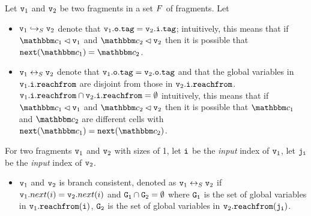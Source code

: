 Let $\mathtt{v}_1$ and $\mathtt{v}_2$ be two fragments in a set $F$ of fragments.
Let
\begin{itemize}
\item  $\mathtt{v}_1 \hookrightarrow_S \mathtt{v}_2$ denote that $\mathtt{v}_1.\mathtt{o}.\mathtt{tag} = \mathtt{v}_2.\mathtt{i}.\mathtt{tag}$;
   
  intuitively, this means that if
  $\cell_1 \lhd \frag_1$ and  $\cell_2 \lhd \frag_2$ then it is possible that
  $\mathtt{next}(\cell_1) = \cell_2$.
\item  $\mathtt{v}_1 \leftrightarrow_S \mathtt{v}_2$ denote that $\mathtt{v}_1.\mathtt{o}.\mathtt{tag} = \mathtt{v}_2.\mathtt{o}.\mathtt{tag}$ and that 
  the global variables in  $\mathtt{v}_1.\mathtt{i}.\mathtt{reachfrom}$ are disjoint from
  those in $\mathtt{v}_2.\mathtt{i}.\mathtt{reachfrom}$.
  $\mathtt{v}_1.\mathtt{i}.\mathtt{reachfrom} \cap \mathtt{v}_2.\mathtt{i}.\mathtt{reachfrom} = \emptyset$ 
    
  intuitively, this means that if
  $\cell_1 \lhd \frag_1$ and  $\cell_2 \lhd \frag_2$ then it is possible that
  $\cell_1$ and $\cell_2$ are different cells with
  $\mathtt{next}(\cell_1) = \mathtt{next}(\cell_2)$.
\end{itemize}
For two fragments $\mathtt{v}_1$ and $\mathtt{v}_2$ with sizes of 1, let $\tt i$ be the {\em input} index of $\mathtt{v}_1$, let $\tt j_i$ be the {\em input} index of $\mathtt{v}_2$.
 \begin{itemize}
 \item $\mathtt{v}_1$ and $\mathtt{v}_2$ is branch consistent, denoted as $\mathtt{v}_1 \leftrightarrow_S \mathtt{v}_2$ if $\mathtt{v}_1.next(i) = \mathtt{v}_2.next(i)$ and $\tt G_1 \cap G_2 = \emptyset$ where $\tt G_1$ is the set of global variables in $\mathtt{v}_1.{\tt reachfrom}(\tt i)$,  $\tt G_2$ is the set of global variables in $\mathtt{v}_2.{\tt reachfrom}(\tt j_i)$.
 \end{itemize}

